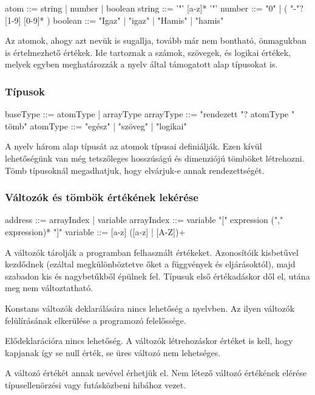 \begin{ebnf}
atom ::= string | number | boolean
string ::= '"' [a-z]* '"'
number ::= "0" | ( "-"? [1-9] [0-9]* )
boolean ::= "Igaz" | "igaz" | "Hamis" | "hamis"
\end{ebnf}

Az atomok, ahogy azt nevük is sugallja, tovább már nem bontható, önmagukban is értelmezhető értékek. Ide tartoznak a számok, szövegek, és logikai értékek, melyek egyben meghatározzák a nyelv által támogatott alap típusokat is.

\subsubsection{Típusok}

\begin{ebnf}
baseType ::= atomType | arrayType
arrayType ::= "rendezett "? atomType " tömb"
atomType ::= "egész" | "szöveg" | "logikai"
\end{ebnf}

A nyelv három alap típusát az atomok típusai definiálják. Ezen kívül lehetőségünk van még tetszőleges hosszúságú és dimenziójú tömböket létrehozni. Tömb típusoknál megadhatjuk, hogy elvárjuk-e annak rendezettségét.

\subsubsection{Változók és tömbök értékének lekérése}

\begin{ebnf}
address ::= arrayIndex | variable
arrayIndex ::= variable "[" expression ("," expression)* "]"
variable ::= [a-z] ([a-z] | [A-Z])+
\end{ebnf}

A változók tárolják a programban felhasznált értékeket. Azonosítóik kisbetűvel kezdődnek (ezáltal megkülönböztetve őket a függvények és eljárásoktól), majd szabadon kis és nagybetűkből épülnek fel. Típusuk első értékadáskor dől el, utána meg nem változtatható. 

Konstans változók deklarálására nincs lehetőség a nyelvben. Az ilyen változók felülírásának elkerülése a programozó felelőssége.

Elődeklarációra nincs lehetőség. A változók létrehozáskor értéket is kell, hogy kapjanak így se null érték, se üres változó nem lehetséges.

A változó értékét annak nevével érhetjük el. Nem létező változó értékének elérése típusellenörzési vagy futásközbeni hibához vezet.

